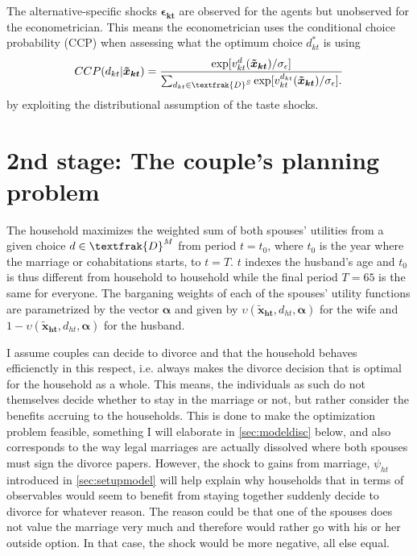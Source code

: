 The alternative-specific shocks $\boldsymbol{\epsilon_{kt}}$ are observed for the agents but unobserved for the econometrician. This means the econometrician uses the conditional choice probability (CCP) when assessing what the optimum choice $d_{kt}^*$ is using
\begin{align*}
CCP(d_{kt}|\boldsymbol{\tilde{x}_{kt}})=\frac{\exp[v_{kt}^{d}(\boldsymbol{\tilde{x}_{kt}})/ \sigma_{\epsilon}]}{\sum_{d_{kt} \in \textfrak{D}^S} { \exp[v_{kt}^{d_{kt}}(\boldsymbol{\tilde{x}_{kt}})/ \sigma_{\epsilon}].  }}
\end{align*}
by exploiting the distributional assumption of the taste shocks. 

\section{2nd stage: The couple's planning problem}
The household maximizes the weighted sum of both spouses' utilities from a given choice $d\in\textfrak{D}^M$ from period $t=t_0$, where $t_0$ is the year where the marriage or cohabitations starts, to $t=T$. $t$ indexes the husband's age and $t_0$ is thus different from household to household while the final period $T=65$ is the same for everyone. The barganing weights of each of the spouses' utility functions are parametrized by the vector $\boldsymbol{\alpha}$ and given by $\upsilon(\boldsymbol{\tilde{x}_{ht}},d_{ht},\boldsymbol{\alpha})$ for the wife and $1-\upsilon(\boldsymbol{\tilde{x}_{ht}},d_{ht},\boldsymbol{\alpha})$ for the husband. 

I assume couples can decide to divorce and that the household behaves efficienctly in this respect, i.e. always makes the divorce decision that is optimal for the household as a whole. This means, the individuals as such do not themselves decide whether to stay in the marriage or not, but rather consider the benefits accruing to the households. This is done to make the optimization problem feasible, something I will elaborate in \autoref{sec:modeldisc} below, and also corresponds to the way legal marriages are actually dissolved where both spouses must sign the divorce papers. However, the shock to gains from marriage, $\psi_{ht}$ introduced in \autoref{sec:setupmodel} will help explain why households that in terms of observables would seem to benefit from staying together suddenly decide to divorce for whatever reason. The reason could be that one of the spouses does not value the marriage very much and therefore would rather go with his or her outside option. In that case, the shock would be more negative, all else equal.

